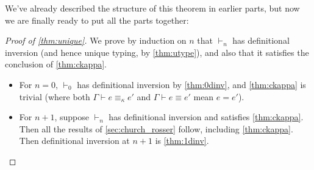 We've already described the structure of this theorem in earlier parts, but now we are finally ready to put all the parts together:

\begin{proof}[Proof of \autoref{thm:unique}]
We prove by induction on $n$ that $\vdash_n$ has definitional inversion (and hence unique typing, by \autoref{thm:utype}), and also that it satisfies the conclusion of \autoref{thm:ckappa}.
\begin{itemize}
\item For $n=0$, $\vdash_0$ has definitional inversion by \autoref{thm:0dinv}, and \autoref{thm:ckappa} is trivial (where both $\Gamma\vdash e\equiv_\kappa e'$ and $\Gamma\vdash e\equiv e'$ mean $e=e'$).
\item For $n+1$, suppose $\vdash_n$ has definitional inversion and satisfies \autoref{thm:ckappa}. Then all the results of \autoref{sec:church_rosser} follow, including \autoref{thm:ckappa}. Then definitional inversion at $n+1$ is \autoref{thm:1dinv}.
\end{itemize}
\end{proof}

